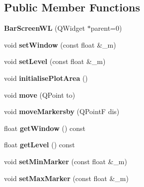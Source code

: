 \subsection*{Public Member Functions}
\begin{DoxyCompactItemize}
\item 
\mbox{\label{classBarScreenWL_a361e5d99c9ba639e5caa053bb5f161e0}} 
{\bfseries Bar\+Screen\+WL} (Q\+Widget $\ast$parent=0)
\item 
\mbox{\label{classBarScreenWL_a6f4e3adc277e51b8fc427a06ee0c494d}} 
void {\bfseries set\+Window} (const float \&\+\_\+m)
\item 
\mbox{\label{classBarScreenWL_a23531a0e46637ef6fbbfe5c192521cd2}} 
void {\bfseries set\+Level} (const float \&\+\_\+m)
\item 
\mbox{\label{classBarScreenWL_a3130db616461fb3e9db9b54188d2715b}} 
void {\bfseries initialise\+Plot\+Area} ()
\item 
\mbox{\label{classBarScreenWL_aac2ca60412c5718c354191b2e8d8ddc9}} 
void {\bfseries move} (Q\+Point to)
\item 
\mbox{\label{classBarScreenWL_a6a7085d5b14f17255b4724eb011b3e57}} 
void {\bfseries move\+Markersby} (Q\+PointF dis)
\item 
\mbox{\label{classBarScreenWL_a1b374e47c58463d100823d9a10efa98a}} 
float {\bfseries get\+Window} () const
\item 
\mbox{\label{classBarScreenWL_a9ad0bab5b89b52d377c4fd835411cbc0}} 
float {\bfseries get\+Level} () const
\item 
\mbox{\label{classBarScreenWL_ac881bb98cc168be4ec5a85b7eec08998}} 
void {\bfseries set\+Min\+Marker} (const float \&\+\_\+m)
\item 
\mbox{\label{classBarScreenWL_ac4924b94bdf8b03a4cdf401e9e5692c4}} 
void {\bfseries set\+Max\+Marker} (const float \&\+\_\+m)
\item 
\mbox{\label{classBarScreenWL_a3a2f5fd225168fe850d08d57a7d46e23}} 

\end{DoxyCompactItemize}
